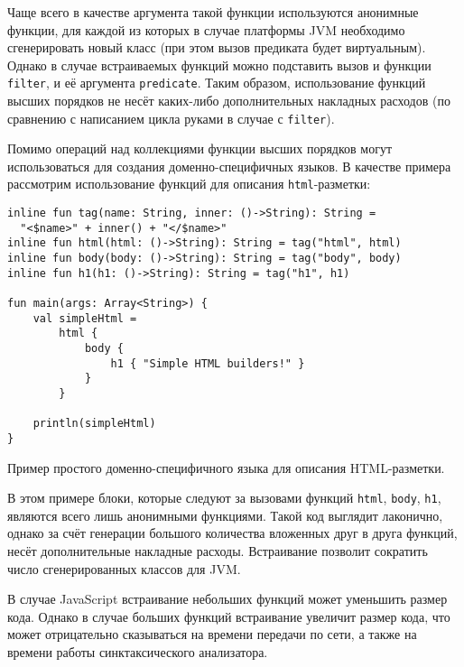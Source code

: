 Чаще всего в качестве аргумента такой функции используются анонимные
функции, для каждой из которых в случае платформы JVM необходимо
сгенерировать новый класс (при этом вызов предиката будет виртуальным).
Однако в случае встраиваемых функций можно подставить вызов
и функции \texttt{filter}, и её аргумента \texttt{predicate}.
Таким образом, использование функций высших порядков не
несёт каких-либо дополнительных накладных расходов (по сравнению
с написанием цикла руками в случае с \texttt{filter}).

Помимо операций над коллекциями функции высших порядков
могут использоваться для создания доменно-специфичных
языков. В качестве примера рассмотрим использование
функций для описания \texttt{html}-разметки:
\begin{listing}[H]
\begin{verbatim}
inline fun tag(name: String, inner: ()->String): String =
  "<$name>" + inner() + "</$name>"
inline fun html(html: ()->String): String = tag("html", html)
inline fun body(body: ()->String): String = tag("body", body)
inline fun h1(h1: ()->String): String = tag("h1", h1)

fun main(args: Array<String>) {
    val simpleHtml =
        html {
            body {
                h1 { "Simple HTML builders!" }
            }
        }

    println(simpleHtml)
}
\end{verbatim}
\caption{Пример простого доменно-специфичного языка для описания HTML-разметки.}
\end{listing}

В этом примере блоки, которые следуют за вызовами функций
\texttt{html}, \texttt{body}, \texttt{h1},
являются всего лишь анонимными функциями.
Такой код выглядит лаконично, однако за счёт генерации большого
количества вложенных друг в друга функций, несёт дополнительные
накладные расходы. Встраивание позволит сократить
число сгенерированных классов для JVM.

В случае JavaScript встраивание небольших функций может
уменьшить размер кода. Однако в случае больших функций
встраивание увеличит размер кода, что может
отрицательно сказываться на времени передачи по сети, а также
на времени работы синктаксического анализатора.

